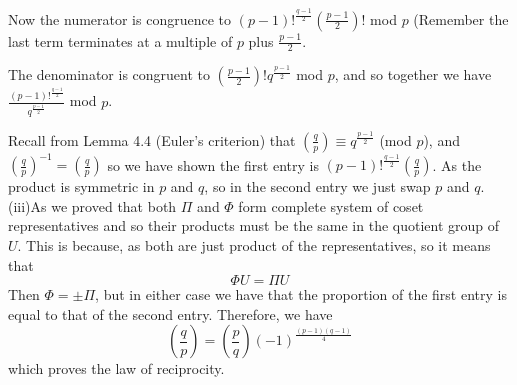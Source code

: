 \begin{enumerate}
    Now the numerator is congruence to
    $(p-1)!^{\frac{q-1}{2}}(\frac{p-1}{2})!$ mod $p$ (Remember the last term terminates at a multiple of $p$ plus $\frac{p-1}{2}$.

    The denominator is congruent to $(\frac{p-1}{2})! q^{\frac{p-1}{2}}$ mod $p$, and so together we have $\frac{(p-1)!^{\frac{q-1}{2}}}{q^{\frac{p-1}{2}}}$ mod $p$.

    Recall from Lemma 4.4 (Euler's criterion) that $(\frac{q}{p}) \equiv q^{\frac{p-1}{2}}$ (mod $p$), and $(\frac{q}{p})^{-1}=(\frac{q}{p})$ so we have shown the first entry is
    $(p-1)!^{\frac{q-1}{2}}(\frac{q}{p})$. As the product is symmetric in $p$ and $q$, so in the second entry we just swap $p$ and $q$.\\
    (iii)As we proved that both $\Pi$ and $\Phi$ form complete system of coset representatives and so their products must be the same in the quotient group of $U$. This is because, as both are just product of the representatives, so it means that
    $$\Phi U=\Pi U$$
    Then $\Phi= \pm \Pi$, but in either case we have that the proportion of the first entry is equal to that of the second entry. Therefore, we have
    $$\left(\frac{q}{p}\right)=\left(\frac{p}{q}\right)(-1)^{\frac{(p-1)(q-1)}{4}}$$
    which proves the law of reciprocity.
\end{enumerate}


